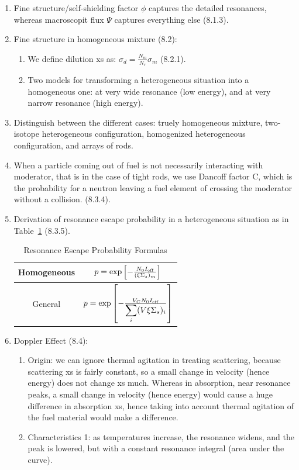 \documentclass{school-22.211-notes}
\begin{document}
\begin{enumerate}
\item Fine structure/self-shielding factor $\phi$ captures the detailed resonances, whereas macroscopit flux $\Psi$ captures everything else (8.1.3).
\item Fine structure in homogeneous mixture (8.2):
  \begin{enumerate}
    \item We define dilution xs as: $\sigma_d = \frac{N_m}{N_r} \sigma_m$ (8.2.1). 
    \item Two models for transforming a heterogeneous situation into a homogeneous one: 
      at very wide resonance (low energy), and at very narrow resonance (high energy). 
  \end{enumerate}
\item Distinguish between the different cases: truely homogeneous mixture, two-isotope heterogeneous configuration, homogenized heterogeneous configuration, and arrays of rods. 
\item When a particle coming out of fuel is not necessarily interacting with moderator, that is in the case of tight rods, we use Dancoff factor C, which is the probability for a neutron leaving a fuel element of crossing the moderator without a collision. (8.3.4).
\item Derivation of resonance escape probability in a heterogeneous situation as in Table~\ref{p-formulas} (8.3.5).
\begin{table}
  \centering
  \begin{tabular}{|c|c|} \hline
    Homogeneous & $p = \exp \left[ - \frac{N_0 I_{\mathrm{eff}}}{(\xi \Sigma_s)_m}  \right]$ \\ \hline
    General & $p = \exp \left[ - \frac{V_C N_0 I_{\mathrm{eff}}}{\displaystyle\sum_i (V \xi \Sigma_s)_i}  \right]$ \\  \hline
  \end{tabular}
  \caption{Resonance Escape Probability Formulas} \label{p-formulas}
\end{table}
\item Doppler Effect (8.4):
\begin{enumerate}
\item Origin: we can ignore thermal agitation in treating scattering, because scattering xs is fairly constant, so a small change in velocity (hence energy) does not change xs much. Whereas in absorption, near resonance peaks, a small change in velocity (hence energy) would cause a huge difference in absorption xs, hence taking into account thermal agitation of the fuel material would make a difference. 
\item Characteristics 1: as temperatures increase, the resonance widens, and the peak is lowered, but with a constant resonance integral (area under the curve). 

\end{enumerate}
\end{enumerate}
\end{document}
